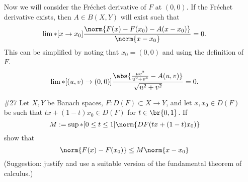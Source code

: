 \documentclass[11pt, oneside]{article}
\begin{document}
\begin{enumerate}
    Now we will consider the Fr\'echet derivative of $F$ at $(0, 0)$.
    If the Fr\'echet derivative exists, then $A \in B(X, Y)$ will exist such
    that
    \[
      \lim*[x \to x_0]{\frac{\norm{F(x) - F(x_0) - A(x - x_0)}}{\norm{x - x_0}}} = 0.
    \]
    This can be simplified by noting that $x_0 = (0, 0)$ and using the
    definition of $F$.
    \[
      \lim*[(u, v) \to (0, 0)]{\frac{\abs{\frac{uv^2}{u^2 + v^4} - A(u, v)}}{\sqrt{u^2 + v^2}}} = 0.
    \]

  \item[\#27]
    Let $X, Y$ be Banach spaces, $F: D(F) \subset X \to Y$, and let
    $x, x_0 \in D(F)$ be such that $tx + (1 - t)x_0 \in D(F)$ for
    $t \in \br{0, 1}$.
    If
    \[
      M := \sup*[0 \le t \le 1]{\norm{DF(tx + (1 - t)x_0)}}
    \]
    show that
    \[
      \norm{F(x) - F(x_0)} \le M\norm{x - x_0}
    \]
    (Suggestion: justify and use a suitable version of the fundamental theorem
    of calculus.)
\end{enumerate}
\end{document}
